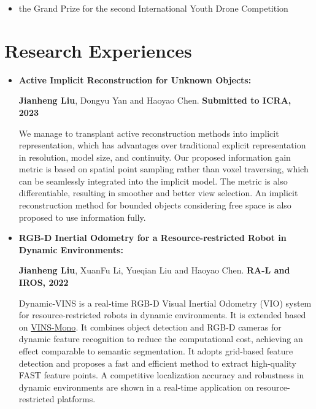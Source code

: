 \documentclass[11pt,a4paper,sans]{moderncv}        %
\begin{document}
{\begin{itemize}
\item{the Grand Prize for the second International Youth Drone Competition}

\end{itemize}

\section{Research Experiences}

\vspace{6pt}

\begin{itemize}

    \item \textbf{Active Implicit Reconstruction for Unknown Objects:} 

\textbf{Jianheng Liu}, Dongyu Yan and Haoyao Chen. \textbf{Submitted to ICRA, 2023}

We manage to transplant active reconstruction methods into
implicit representation, which has advantages over
traditional explicit representation in resolution, model
size, and continuity.
Our proposed information gain metric is based on spatial
point sampling rather than voxel traversing, which can be
seamlessly integrated into the implicit model.
The metric is also differentiable, resulting in smoother
and better view selection.
An implicit reconstruction method for bounded objects
considering free space is also proposed to use information
fully.
    
\item \textbf{RGB-D Inertial Odometry for a Resource-restricted Robot in Dynamic Environments:} 

\textbf{Jianheng Liu}, XuanFu Li, Yueqian Liu and Haoyao Chen. \textbf{RA-L and IROS, 2022}

Dynamic-VINS is a real-time RGB-D Visual Inertial Odometry (VIO) system for resource-restricted robots in dynamic environments. It is extended based on \href{https://github.com/HKUST-Aerial-Robotics/VINS-Mono}{VINS-Mono}. It combines object detection and RGB-D cameras for dynamic feature recognition to reduce the computational cost, achieving an effect comparable to semantic segmentation. It adopts grid-based feature detection and proposes a fast and efficient method to extract high-quality FAST feature points. A competitive localization accuracy and robustness in dynamic environments are shown in a real-time application on  resource-restricted platforms.

\vspace{6pt}


\end{itemize}}
\end{document}
